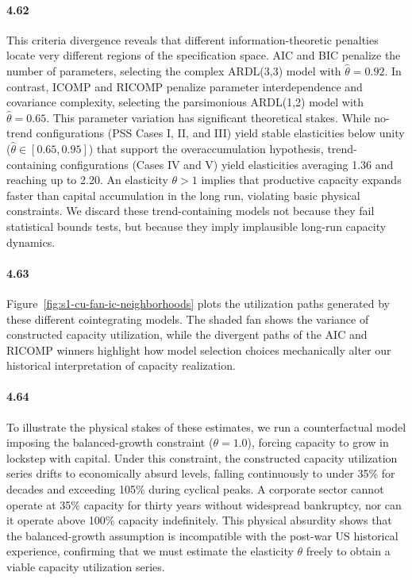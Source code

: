 \paragraph{4.62}
This criteria divergence reveals that different information-theoretic penalties locate very different regions of the specification space. AIC and BIC penalize the number of parameters, selecting the complex ARDL(3,3) model with $\hat{\theta}=0.92$. In contrast, ICOMP and RICOMP penalize parameter interdependence and covariance complexity, selecting the parsimonious ARDL(1,2) model with $\hat{\theta}=0.65$. This parameter variation has significant theoretical stakes. While no-trend configurations (PSS Cases I, II, and III) yield stable elasticities below unity ($\hat{\theta} \in [0.65, 0.95]$) that support the overaccumulation hypothesis, trend-containing configurations (Cases IV and V) yield elasticities averaging 1.36 and reaching up to 2.20. An elasticity $\theta > 1$ implies that productive capacity expands faster than capital accumulation in the long run, violating basic physical constraints. We discard these trend-containing models not because they fail statistical bounds tests, but because they imply implausible long-run capacity dynamics.

\paragraph{4.63}
Figure~\ref{fig:s1-cu-fan-ic-neighborhoods} plots the utilization paths generated by these different cointegrating models. The shaded fan shows the variance of constructed capacity utilization, while the divergent paths of the AIC and RICOMP winners highlight how model selection choices mechanically alter our historical interpretation of capacity realization.

\paragraph{4.64}
To illustrate the physical stakes of these estimates, we run a counterfactual model imposing the balanced-growth constraint ($\theta = 1.0$), forcing capacity to grow in lockstep with capital. Under this constraint, the constructed capacity utilization series drifts to economically absurd levels, falling continuously to under 35\% for decades and exceeding 105\% during cyclical peaks. A corporate sector cannot operate at 35\% capacity for thirty years without widespread bankruptcy, nor can it operate above 100\% capacity indefinitely. This physical absurdity shows that the balanced-growth assumption is incompatible with the post-war US historical experience, confirming that we must estimate the elasticity $\theta$ freely to obtain a viable capacity utilization series.

